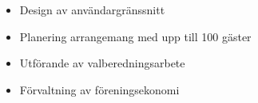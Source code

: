 \documentclass[a4paper,12pt]{memoir} %
\begin{document}

{\begin{itemize}
	\item Design av användargränssnitt 
	\item Planering arrangemang med upp till 100 gäster
	\item Utförande av valberedningsarbete
	\item Förvaltning av föreningsekonomi
\end{itemize}}














\end{document}
